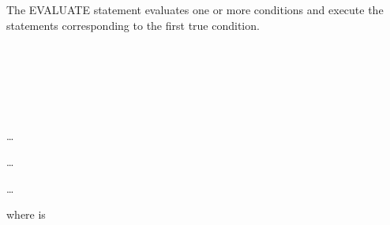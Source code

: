 The EVALUATE statement evaluates one or more conditions and execute the statements corresponding to the first true condition.

\begin{syntax}
  \begin{1=}
    \expression \\
     \\
  \end{1=}
  \begin{0-1}
    \begin{1=}
      \expression \\
       \\
    \end{1=}
  \end{0-1} \ldots

  \begin{1=}
    \begin{0-1}
       
    \end{0-1}\ldots\ {}
    \imperativestatement
  \end{1=} \ldots

  \begin{0-1}
      \imperativestatement
  \end{0-1}

  \begin{0-1}
  \end{0-1}
\end{syntax}

where  is

\begin{syntax}
  \begin{1=}
    \begin{0-1}
      \begin{1=}
         \\
      \end{1=}
      \expression
    \end{0-1} \\

     \\
     \\
  \end{1=}
\end{syntax}

